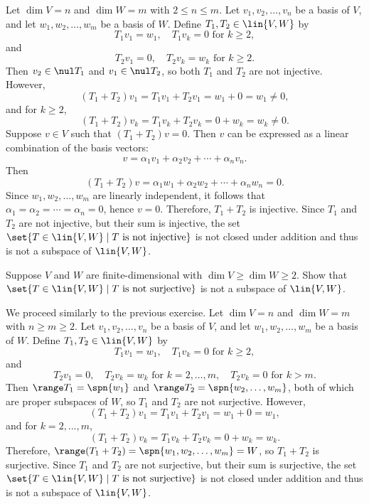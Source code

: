 \begin{sol}
    Let $\dim V = n$ and $\dim W = m$ with $2 \leq n \leq m$. Let $v_1, v_2, \ldots, v_n$ be a basis of $V$, and let $w_1, w_2, \ldots, w_m$ be a basis of $W$. Define $T_1, T_2 \in \lin{V, W}$ by
    \[T_1 v_1 = w_1, \quad T_1 v_k = 0 \text{ for } k \geq 2,\]
    and
    \[T_2 v_1 = 0, \quad T_2 v_k = w_k \text{ for } k \geq 2.\]
    Then $v_2 \in \nul T_1$ and $v_1 \in \nul T_2$, so both $T_1$ and $T_2$ are not injective. However,
    \[(T_1 + T_2)v_1 = T_1 v_1 + T_2 v_1 = w_1 + 0 = w_1 \neq 0,\]
    and for $k \geq 2$,
    \[(T_1 + T_2)v_k = T_1 v_k + T_2 v_k = 0 + w_k = w_k \neq 0.\]
    Suppose $v \in V$ such that $(T_1 + T_2)v = 0$. Then $v$ can be expressed as a linear combination of the basis vectors:
    \[v = \alpha_1 v_1 + \alpha_2 v_2 + \cdots + \alpha_n v_n.\]
    Then
    \[(T_1 + T_2)v = \alpha_1 w_1 + \alpha_2 w_2 + \cdots + \alpha_n w_n = 0.\]
    Since $w_1, w_2, \ldots, w_m$ are linearly independent, it follows that $\alpha_1 = \alpha_2 = \cdots = \alpha_n = 0$, hence $v = 0$. Therefore, $T_1 + T_2$ is injective. Since $T_1$ and $T_2$ are not injective, but their sum is injective, the set $\set{T \in \lin{V, W} \mid T \text{ is not injective}}$ is not closed under addition and thus is not a subspace of $\lin{V, W}$.
\end{sol}

\begin{exercise}[3b8]
    Suppose $V$ and $W$ are finite-dimensional with $\dim V \geq \dim W \geq 2$. Show that $\set{T \in \lin{V, W} \mid T \text{ is not surjective}}$ is not a subspace of $\lin{V, W}$.
\end{exercise}

\begin{sol}
    We proceed similarly to the previous exercise. Let $\dim V = n$ and $\dim W = m$ with $n \geq m \geq 2$. Let $v_1, v_2, \ldots, v_n$ be a basis of $V$, and let $w_1, w_2, \ldots, w_m$ be a basis of $W$. Define $T_1, T_2 \in \lin{V, W}$ by
    \[T_1 v_1 = w_1, \quad T_1 v_k = 0 \text{ for } k \geq 2,\]
    and
    \[T_2 v_1 = 0, \quad T_2 v_k = w_k \text{ for } k = 2, \ldots, m, \quad T_2 v_k = 0 \text{ for } k > m.\]
    Then $\range T_1 = \spn{w_1}$ and $\range T_2 = \spn{w_2, \ldots, w_m}$, both of which are proper subspaces of $W$, so $T_1$ and $T_2$ are not surjective. However,
    \[(T_1 + T_2)v_1 = T_1 v_1 + T_2 v_1 = w_1 + 0 = w_1,\]
    and for $k = 2, \ldots, m$,
    \[(T_1 + T_2)v_k = T_1 v_k + T_2 v_k = 0 + w_k = w_k.\]
    Therefore, $\range(T_1 + T_2) = \spn{w_1, w_2, \ldots, w_m} = W$, so $T_1 + T_2$ is surjective. Since $T_1$ and $T_2$ are not surjective, but their sum is surjective, the set $\set{T \in \lin{V, W} \mid T \text{ is not surjective}}$ is not closed under addition and thus is not a subspace of $\lin{V, W}$.
\end{sol}

